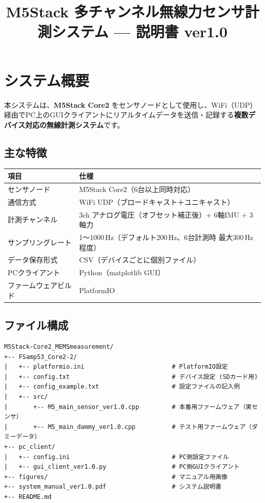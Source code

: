 \documentclass[a4paper,10pt]{ltjsarticle}
\title{M5Stack 多チャンネル無線力センサ計測システム — 説明書 ver1.0}
\author{}
\date{}
\begin{document}
\maketitle
\tableofcontents
\newpage

\section{システム概要}

本システムは、\textbf{M5Stack Core2} をセンサノードとして使用し、WiFi（UDP）経由でPC上のGUIクライアントにリアルタイムデータを送信・記録する\textbf{複数デバイス対応の無線計測システム}です。

\subsection{主な特徴}

\begin{table}[h]
\centering
\begin{tabular}{ll}
\toprule
\textbf{項目} & \textbf{仕様} \\
\midrule
センサノード & M5Stack Core2（6台以上同時対応） \\
通信方式 & WiFi UDP（ブロードキャスト＋ユニキャスト） \\
計測チャンネル & 3ch アナログ電圧（オフセット補正後）+ 6軸IMU + 3軸力 \\
サンプリングレート & 1〜1000\,Hz（デフォルト200\,Hz、6台計測時 最大300\,Hz程度） \\
データ保存形式 & CSV（デバイスごとに個別ファイル） \\
PCクライアント & Python（matplotlib GUI） \\
ファームウェアビルド & PlatformIO \\
\bottomrule
\end{tabular}
\end{table}

\subsection{ファイル構成}

\begin{lstlisting}
M5Stack-Core2_MEMSmeasurement/
+-- FSamp53_Core2-2/
|   +-- platformio.ini                        # PlatformIO設定
|   +-- config.txt                            # デバイス設定 (SDカード用)
|   +-- config_example.txt                    # 設定ファイルの記入例
|   +-- src/
|       +-- M5_main_sensor_ver1.0.cpp         # 本番用ファームウェア（実センサ）
|       +-- M5_main_dammy_ver1.0.cpp          # テスト用ファームウェア（ダミーデータ）
+-- pc_client/
|   +-- config.ini                            # PC側設定ファイル
|   +-- gui_client_ver1.0.py                  # PC側GUIクライアント
+-- figures/                                  # マニュアル用画像
+-- system_manual_ver1.0.pdf                  # システム説明書
+-- README.md
\end{lstlisting}
\end{document}
